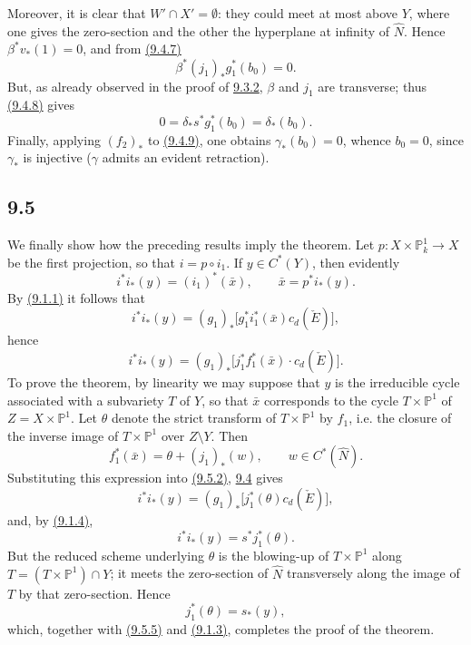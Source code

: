\documentclass[11pt]{article}
\begin{document}
Moreover, it is clear that $W'\cap X'=\emptyset$: they could meet at most above $Y$, where one gives the zero-section and the other the hyperplane at infinity of $\widehat N$. Hence $\beta^*v_*(1)=0$, and from \hyperref[sga5:VII:equation:9.4.7]{(9.4.7)}
\[
\beta^*(j_1)_*g_1^*(b_0)=0.
\tag{9.4.8}\label{sga5:VII:equation:9.4.8}
\]
But, as already observed in the proof of \hyperref[sga5:VII:equation:9.3.2]{9.3.2}, $\beta$ and $j_1$ are transverse; thus \hyperref[sga5:VII:equation:9.4.8]{(9.4.8)} gives
\[
0=\delta_*s^*g_1^*(b_0)=\delta_*(b_0).
\tag{9.4.9}\label{sga5:VII:equation:9.4.9}
\]
Finally, applying $(f_2)_*$ to \hyperref[sga5:VII:equation:9.4.9]{(9.4.9)}, one obtains $\gamma_*(b_0)=0$, whence $b_0=0$, since $\gamma_*$ is injective ($\gamma$ admits an evident retraction).

\subsection*{9.5}\label{sga5:VII:subsection:9.5}

We finally show how the preceding results imply the theorem. Let $p:X\times\mathbb P^1_k\to X$ be the first projection, so that $i=p\circ i_1$. If $y\in C^*(Y)$, then evidently
\[
i^*i_*(y)=(i_1)^*(\bar x),\qquad \bar x=p^*i_*(y).
\tag{9.5.1}\label{sga5:VII:equation:9.5.1}
\]
By \hyperref[sga5:VII:equation:9.1.1]{(9.1.1)} it follows that
\[
i^*i_*(y)=(g_1)_*\bigl[g_1^*i_1^*(\bar x)c_d(\check E)\bigr],
\]
hence
\[
i^*i_*(y)=(g_1)_*\bigl[j_1^*f_1^*(\bar x)\cdot c_d(\check E)\bigr].
\tag{9.5.2}\label{sga5:VII:equation:9.5.2}
\]
To prove the theorem, by linearity we may suppose that $y$ is the irreducible cycle associated with a subvariety $T$ of $Y$, so that $\bar x$ corresponds to the cycle $T\times\mathbb P^1$ of $Z=X\times\mathbb P^1$. Let $\theta$ denote the strict transform of $T\times\mathbb P^1$ by $f_1$, i.e. the closure of the inverse image of $T\times\mathbb P^1$ over $Z\setminus Y$. Then
\[
f_1^*(\bar x)=\theta+(j_1)_*(w),\qquad w\in C^*(\widehat N).
\tag{9.5.3}\label{sga5:VII:equation:9.5.3}
\]
Substituting this expression into \hyperref[sga5:VII:equation:9.5.2]{(9.5.2)}, \hyperref[sga5:VII:lemma:9.4]{9.4} gives
\[
i^*i_*(y)=(g_1)_*\bigl[j_1^*(\theta)c_d(\check E)\bigr],
\tag{9.5.4}\label{sga5:VII:equation:9.5.4}
\]
and, by \hyperref[sga5:VII:equation:9.1.4]{(9.1.4)},
\[
i^*i_*(y)=s^*j_1^*(\theta).
\tag{9.5.5}\label{sga5:VII:equation:9.5.5}
\]
But the reduced scheme underlying $\theta$ is the blowing-up of $T\times\mathbb P^1$ along $T=(T\times\mathbb P^1)\cap Y$; it meets the zero-section of $\widehat N$ transversely along the image of $T$ by that zero-section. Hence
\[
j_1^*(\theta)=s_*(y),
\]
which, together with \hyperref[sga5:VII:equation:9.5.5]{(9.5.5)} and \hyperref[sga5:VII:equation:9.1.3]{(9.1.3)}, completes the proof of the theorem.
\end{document}
